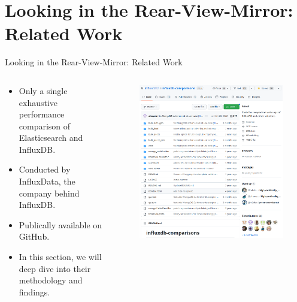 \documentclass[compress,aspectratio=169]{beamer}
\begin{document}
\section[Related Work]{Looking in the Rear-View-Mirror: Related Work}
\begin{frame}{Looking in the Rear-View-Mirror: Related Work}
\begin{columns}[T]
\begin{column}{0.5\textwidth}
\begin{itemize}
  \item Only a single exhaustive performance comparison of Elasticsearch and InfluxDB.
  \item Conducted by InfluxData, the company behind InfluxDB.
  \item Publically available on GitHub.
  \item In this section, we will deep dive into their methodology and findings.
\end{itemize}
\end{column}
\begin{column}{0.5\textwidth}
\begin{figure}
  \includegraphics[height=.8\textheight]{github_influx.png}
\end{figure}
\end{column}
\end{columns}
\end{frame}
\end{document}
